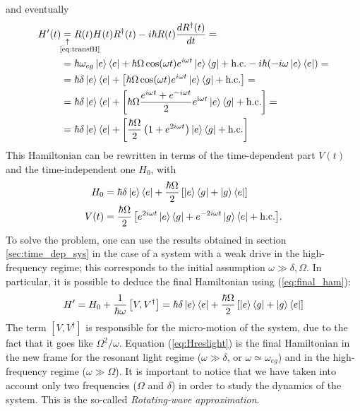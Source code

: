 and eventually
\begin{align*}
    H'(t) &\equalexpl{\ref{eq:transfH}} R(t) H(t) R^\dagger(t) - i \hbar R(t) \frac{dR^\dagger(t)}{dt} =\\
    &= \hbar\omega_{eg} \ket{e}\bra{e} + \hbar\Omega\cos(\omega t)e^{i\omega t} \ket{e}\bra{g} + \text{h.c.} -i\hbar(-i\omega\ket{e}\bra{e})=\\
    &= \hbar  \delta \ket{e}\bra{e} + \left[\hbar \Omega \cos(\omega t) e^{{i} \omega t} \ket{e}\bra{g} + \text{h.c.} \right] = \\
    &= \hbar  \delta \ket{e}\bra{e} + \left[\hbar \Omega  \frac{e^{ {i} \omega t} + e^{ - {i} \omega t}}{2} e^{ \text{i} \omega t} \ket{e}\bra{g} + \text{h.c.} \right] = \\
    &= \hbar  \delta \ket{e}\bra{e} + \left[ \frac{\hbar  \Omega}{2} \left(1 + e^{ 2 {i} \omega t} \right) \ket{e}\bra{g} + \text{h.c.} \right]
\end{align*}
This Hamiltonian can be rewritten in terms of the time-dependent part $V(t)$ and the time-independent one $H_0$, with
\begin{align}
    H_0 &= {\hbar \delta \ket{e}\bra{e} + \frac{\hbar \Omega}{2} \left[\ket{e}\bra{g} + \ket{g}\bra{e} \right]}   \\ 
    V(t) & = {\frac{\hbar \Omega}{2} \left[e^{2 {i} \omega t} \ket{e}\bra{g} + e^{- 2 {i} \omega t} \ket{g}\bra{e} + \text{h.c.} \right]}. 
\end{align}
To solve the problem, one can use the results obtained in section \ref{sec:time_dep_sys} in the case of a system with a weak drive in the high-frequency regime; this corresponds to the initial assumption $\omega \gg \delta, \Omega$. In particular, it is possible to deduce the final Hamiltonian using (\ref{eq:final_ham}):
\begin{equation}
\label{eq:Hreslight}
    H'= H_0 + \frac{1}{\hbar \omega} \left[V, V^{\dagger}\right] = \hbar \delta \ket{e}\bra{e} + \frac{\hbar \Omega}{2} \left[\ket{e}\bra{g} + \ket{g}\bra{e} \right]
\end{equation}
The term $\left[V, V^{\dagger}\right]$ is responsible for the micro-motion of the system, due to the fact that it goes like $\Omega^2/\omega$. Equation (\ref{eq:Hreslight}) is the final Hamiltonian in the new frame for the resonant light regime ($\omega \gg \delta$, or $\omega \simeq \omega_{eg}$) and in the high-frequency regime ($\omega \gg \Omega$). It is important to notice that we have taken into account only two frequencies ($\Omega$ and $\delta$) in order to study the dynamics of the system. This is the so-called \textit{Rotating-wave approximation}. \\


